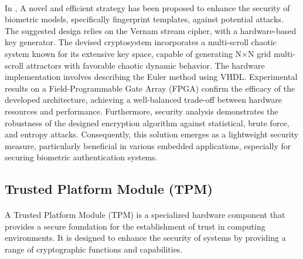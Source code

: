 \paragraph*{}
In \cite{https://doi.org/10.1002/dac.4211}, A novel and efficient strategy has been proposed to enhance the security of biometric models, specifically fingerprint templates, against potential attacks. The suggested design relies on the Vernam stream cipher, with a hardware-based key generator. The devised cryptosystem incorporates a multi-scroll chaotic system known for its extensive key space, capable of generating N×N grid multi-scroll attractors with favorable chaotic dynamic behavior. The hardware implementation involves describing the Euler method using VHDL. Experimental results on a Field-Programmable Gate Array (FPGA) confirm the efficacy of the developed architecture, achieving a well-balanced trade-off between hardware resources and performance. Furthermore, security analysis demonstrates the robustness of the designed encryption algorithm against statistical, brute force, and entropy attacks. Consequently, this solution emerges as a lightweight security measure, particularly beneficial in various embedded applications, especially for securing biometric authentication systems.
\subsection{Trusted Platform Module (TPM)}
\paragraph*{}
A Trusted Platform Module (TPM) is a specialized hardware component that provides a secure foundation for the establishment of trust in computing environments. It is designed to enhance the security of systems by providing a range of cryptographic functions and capabilities.
